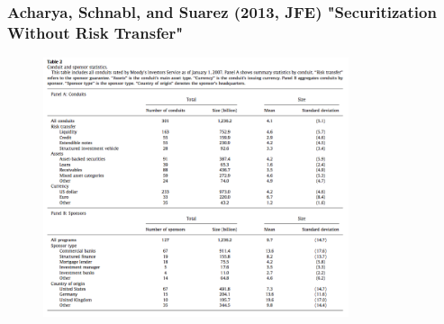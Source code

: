\documentclass[11pt]{beamer}
\begin{document}
\begin{frame}
	\frametitle{Acharya, Schnabl, and Suarez (2013, JFE) "Securitization Without Risk Transfer"}
    \begin{figure}
    	\begin{center}
    	\includegraphics[width=0.8\textwidth]{Figures/ASS2013_Table2.png}
        \end{center}
    \end{figure}
\end{frame}
\end{document}
